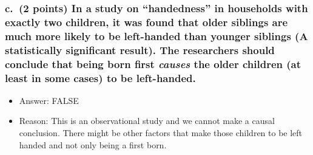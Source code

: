 \documentclass[
]{article}
\providecommand{\tightlist}{%
  \setlength{\itemsep}{0pt}\setlength{\parskip}{0pt}}
\begin{document}
\hypertarget{c.-2-points-in-a-study-on-handedness-in-households-with-exactly-two-children-it-was-found-that-older-siblings-are-much-more-likely-to-be-left-handed-than-younger-siblings-a-statistically-significant-result.-the-researchers-should-conclude-that-being-born-first-causes-the-older-children-at-least-in-some-cases-to-be-left-handed.}{%
\subsubsection{\texorpdfstring{c.~(2 points) In a study on
``handedness'' in households with exactly two children, it was found
that older siblings are much more likely to be left-handed than younger
siblings (A statistically significant result). The researchers should
conclude that being born first \emph{causes} the older children (at
least in some cases) to be
left-handed.}{c.~(2 points) In a study on ``handedness'' in households with exactly two children, it was found that older siblings are much more likely to be left-handed than younger siblings (A statistically significant result). The researchers should conclude that being born first causes the older children (at least in some cases) to be left-handed.}}\label{c.-2-points-in-a-study-on-handedness-in-households-with-exactly-two-children-it-was-found-that-older-siblings-are-much-more-likely-to-be-left-handed-than-younger-siblings-a-statistically-significant-result.-the-researchers-should-conclude-that-being-born-first-causes-the-older-children-at-least-in-some-cases-to-be-left-handed.}}

\begin{itemize}
\tightlist
\item
  Answer: FALSE
\item
  Reason: This is an observational study and we cannot make a causal
  conclusion. There might be other factors that make those children to
  be left handed and not only being a first born.
\end{itemize}
\end{document}
